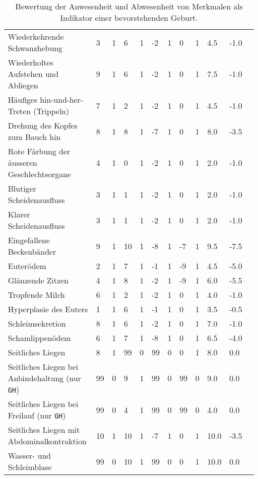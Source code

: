 \begin{landscape}
\begin{table}[h]
\begin{tabular}{  p{8.5cm}  l*{10}{l}}
Wiederkehrende Schwanzhebung & 3 & 1 & 6 & 1 & -2 & 1 & 0 & 1 & 4.5 & -1.0 \\ 
Wiederholtes Aufstehen und Abliegen & 9 & 1 & 6 & 1 & -2 & 1 & 0 & 1 & 7.5 & -1.0 \\ 
Häufiges hin-und-her-Treten (Trippeln) & 7 & 1 & 2 & 1 & -2 & 1 & 0 & 1 & 4.5 & -1.0 \\ 
Drehung des Kopfes zum Bauch hin & 8 & 1 & 8 & 1 & -7 & 1 & 0 & 1 & 8.0 & -3.5 \\ 
Rote Färbung der äusseren Geschlechtsorgane & 4 & 1 & 0 & 1 & -2 & 1 & 0 & 1 & 2.0 & -1.0 \\ 
Blutiger Scheidenausfluss & 3 & 1 & 1 & 1 & -2 & 1 & 0 & 1 & 2.0 & -1.0 \\ 
Klarer Scheidenausfluss & 3 & 1 & 1 & 1 & -2 & 1 & 0 & 1 & 2.0 & -1.0 \\ 
Eingefallene Beckenbänder & 9 & 1 & 10 & 1 & -8 & 1 & -7 & 1 & 9.5 & -7.5 \\ 
Euterödem & 2 & 1 & 7 & 1 & -1 & 1 & -9 & 1 & 4.5 & -5.0 \\ 
Glänzende Zitzen & 4 & 1 & 8 & 1 & -2 & 1 & -9 & 1 & 6.0 & -5.5 \\ 
Tropfende Milch & 6 & 1 & 2 & 1 & -2 & 1 & 0 & 1 & 4.0 & -1.0 \\ 
Hyperplasie des Euters & 1 & 1 & 6 & 1 & -1 & 1 & 0 & 1 & 3.5 & -0.5 \\ 
Schleimsekretion & 8 & 1 & 6 & 1 & -2 & 1 & 0 & 1 & 7.0 & -1.0 \\ 
Schamlippenödem & 6 & 1 & 7 & 1 & -8 & 1 & 0 & 1 & 6.5 & -4.0 \\ 
Seitliches Liegen & 8 & 1 & 99 & 0 & 99 & 0 & 0 & 1 & 8.0 & 0.0 \\ 
Seitliches Liegen bei Anbindehaltung (nur \texttt{GH}) & 99 & 0 & 9 & 1 & 99 & 0 & 99 & 0 & 9.0 & 0.0 \\ 
Seitliches Liegen bei Freilauf (nur \texttt{GH}) & 99 & 0 & 4 & 1 & 99 & 0 & 99 & 0 & 4.0 & 0.0 \\ 
Seitliches Liegen mit Abdominalkontraktion & 10 & 1 & 10 & 1 & -7 & 1 & 0 & 1 & 10.0 & -3.5 \\ 
Wasser- und Schleimblase & 99 & 0 & 10 & 1 & 99 & 0 & 0 & 1 & 10.0 & 0.0 \\ 
		\bottomrule

	\end{tabular}
	\caption{Bewertung der Anwesenheit und Abwesenheit von Merkmalen als Indikator einer bevorstehenden Geburt. }
	\label{tab: Bewertung der Anwesenheit und Abwesenheit von Merkmalen}
\end{table}

\end{landscape}
\restoregeometry %



